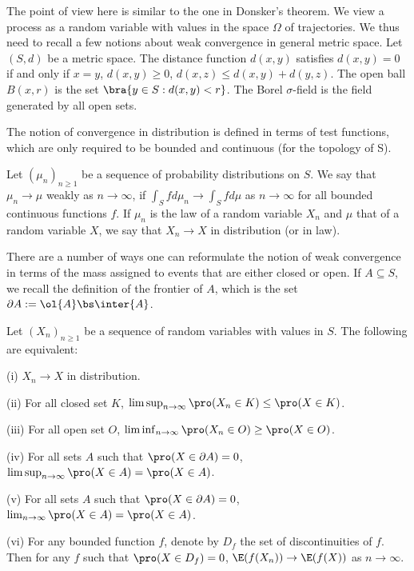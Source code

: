 The point of view here is similar to the one in Donsker's theorem. We view a process as a random variable with values in the space $\Omega$ of trajectories. We thus need to recall a few notions about weak convergence in general metric space. Let $(S, d)$ be a metric space. The distance function $d(x, y)$ satisfies $d(x, y) = 0$ if and only if $x = y$, $d(x, y) \geq 0$, $d(x, z) \leq d(x, y)+d(y, z)$. The open ball $B(x, r)$ is the set $\bra{y \in S: d(x, y) < r}$. The Borel $\sigma$-field is the field generated by all open sets.

The notion of convergence in distribution is defined in terms of test functions, which are only required to be bounded and continuous (for the topology of S).

\begin{definition}
Let $(\mu_n)_{n\geq1}$ be a sequence of probability distributions on $S$. We say that $\mu_n \to \mu$  weakly as $n\to\infty$, if $\int_S f d\mu_n \to \int_S fd\mu$ as $n\to\infty$ for all bounded continuous functions $f$. If $\mu_n$ is the law of a random variable $X_n$ and $\mu$ that of a random variable $X$, we say that $X_n \to X$ in distribution (or in law).
\end{definition}

There are a number of ways one can reformulate the notion of weak convergence in terms of the mass assigned to events that are either closed or open. If $A \subseteq S$, we recall the definition of the frontier of $A$, which is the set $\partial A := \ol{A}\bs \inter{A}$.

\begin{theorem}\label{thm:convergence_distribution}
Let $(X_n)_{n\geq1}$ be a sequence of random variables with values in $S$. The following are equivalent:
\ben
\item [(i)] $X_n \to X$ in distribution.
\item [(ii)] For all closed set $K$, $\limsup_{n\to\infty} \pro(X_n \in K) \leq \pro(X \in K)$.
\item [(iii)] For all open set $O$, $\liminf_{n\to\infty} \pro(X_n \in O) \geq \pro(X \in O)$.
\item [(iv)] For all sets $A$ such that $\pro(X \in \partial A) = 0$, $\limsup_{n\to\infty} \pro(X \in A) = \pro(X \in A)$.
\item [(v)] For all sets $A$ such that $\pro(X \in \partial A) = 0$, $\lim_{n\to\infty} \pro(X \in A) = \pro(X \in A)$.
\item [(vi)] For any bounded function $f$, denote by $D_f$ the set of discontinuities of $f$. Then for any $f$ such that $\pro(X \in D_f ) = 0$, $\E(f(X_n)) \to \E(f(X))$ as $n\to\infty$.
\een
\end{theorem}

